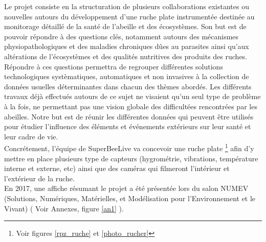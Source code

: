 \documentclass[11pt,french,a4paper]{report}
\begin{document}
Le projet consiste en la structuration de plusieurs collaborations existantes ou nouvelles autours du développement 
d’une ruche plate instrumentée destinée au monitorage détaillé de la santé de l’abeille et des écosystèmes. Son but est de
pouvoir répondre à des questions clés, notamment autours des mécanismes physiopathologiques et des maladies chroniques 
dûes au parasites ainsi qu’aux altérations de l’écosystèmes et des qualités nutritives des produits des ruches. \\
Répondre à ces questions permettra de regrouper différentes solutions technologiques systèmatiques, 
automatiques et non invasives à la collection de données usuelles déterminantes dans chacun des thèmes abordés.
Les différents travaux déjà effectués autours de ce sujet ne visaient qu’un seul type de problème à la fois, 
ne permettant pas une vision globale des difficultées rencontrées par les abeilles. Notre but est de réunir les différentes
données qui peuvent être utilisés pour étudier l’influence des éléments et événements extérieurs sur leur santé et leur cadre de vie.\\

Concrétement, l'équipe de SuperBeeLive va concevoir une ruche plate \footnote{Voir figures \ref{rpz_ruche} et \ref{photo_rucher}} afin d'y mettre 
en place plusieurs type  de capteurs (hygrométrie, vibrations, température interne et externe, etc) ainsi que des caméras qui filmeront 
l'intérieur et l'extérieur de la ruche. \\
En 2017, une affiche résumant le projet a été présentée lors du salon NUMEV (Solutions, Numériques, Matérielles, et 
Modélisation pour l'Environnement et le Vivant) ( Voir Annexes, figure \ref{an1} ). \\ 
\end{document}
